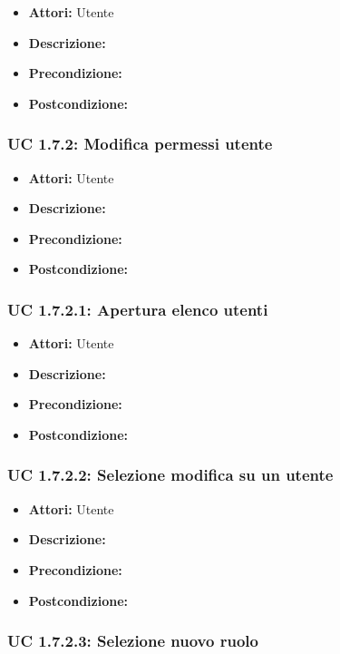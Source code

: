 \begin{itemize}
\item \textbf{Attori:} Utente
\item \textbf{Descrizione:} 
\item \textbf{Precondizione:} 
\item \textbf{Postcondizione:} 
\end{itemize}

\subsubsection{UC 1.7.2: Modifica permessi utente}

\begin{itemize}
\item \textbf{Attori:} Utente
\item \textbf{Descrizione:} 
\item \textbf{Precondizione:} 
\item \textbf{Postcondizione:} 
\end{itemize}

\subsubsection{UC 1.7.2.1: Apertura elenco utenti}

\begin{itemize}
\item \textbf{Attori:} Utente
\item \textbf{Descrizione:} 
\item \textbf{Precondizione:} 
\item \textbf{Postcondizione:} 
\end{itemize}

\subsubsection{UC 1.7.2.2: Selezione modifica su un utente}

\begin{itemize}
\item \textbf{Attori:} Utente
\item \textbf{Descrizione:} 
\item \textbf{Precondizione:} 
\item \textbf{Postcondizione:} 
\end{itemize}

\subsubsection{UC 1.7.2.3: Selezione nuovo ruolo}

